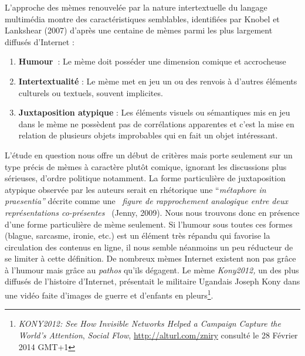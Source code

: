 {{L{\textquoteright}approche des m\`emes renouvel\'ee par la nature
intertextuelle du langage multim\'edia montre des caract\'eristiques
semblables, identifi\'ees par Knobel et Lankshear (2007)
d{\textquoteright}apr\`es une centaine de m\`emes parmi les plus
largement diffus\'es d{\textquoteright}Internet : 

\begin{enumerate}
\item {\color{black}
\textbf{Humour~}: Le m\`eme doit poss\'eder une dimension comique et
accrocheuse}
\item {\color{black}
\textbf{Intertextualit\'e} : Le m\`eme met en jeu un ou des renvois \`a
d{\textquoteright}autres \'el\'ements culturels ou textuels, souvent
implicites.}
\item {\color{black}
\textbf{Juxtaposition atypique} : Les \'el\'ements visuels ou
s\'emantiques mis en jeu dans le m\`eme ne poss\`edent pas de
corr\'elations apparentes et c{\textquoteright}est la mise en relation
de plusieurs objets improbables qui en fait un objet int\'eressant.}
\end{enumerate}
L{\textquoteright}\'etude en question nous offre un d\'ebut de
crit\`eres mais porte seulement sur un type pr\'ecis de m\`emes \`a
caract\`ere plut\^ot comique, ignorant les discussions plus
s\'erieuses, d{\textquoteright}ordre politique notamment. La forme
particuli\`ere de juxtaposition atypique observ\'ee par les auteurs
serait en rh\'etorique une {\textquotedblleft}\textit{m\'etaphore in
praesentia{\textquotedblright} }d\'ecrite comme une
\textit{{\guillemotleft}~figure de rapprochement analogique entre deux
repr\'esentations co-pr\'esentes~{\guillemotright}} (Jenny, 2009). Nous
nous trouvons donc en pr\'esence d{\textquoteright}une forme
particuli\`ere de m\`eme seulement. Si l{\textquoteright}humour sous
toutes ces formes (blague, sarcasme, ironie, etc.) est un \'el\'ement
tr\`es r\'epandu qui favorise la circulation des contenus en ligne, il
nous semble n\'eanmoins un peu r\'educteur de se limiter \`a cette
d\'efinition. De nombreux m\`emes Internet existent non pas gr\^ace \`a
l{\textquoteright}humour mais gr\^ace au \textit{pathos}
qu{\textquoteright}ils d\'egagent. Le m\`eme \textit{Kony2012, }un des
plus diffus\'es de l{\textquoteright}histoire
d{\textquoteright}Internet, pr\'esentait le militaire Ugandais Joseph
Kony dans une vid\'eo faite d{\textquoteright}images de guerre et
d{\textquoteright}enfants en pleurs\footnote{ \textit{KONY2012: See How Invisible Networks Helped a Campaign Capture the World's Attention}, \textit{Social Flow}, \url{http://alturl.com/zniry} consult\'e le 28 F\'evrier 2014 GMT+1}.
}}
